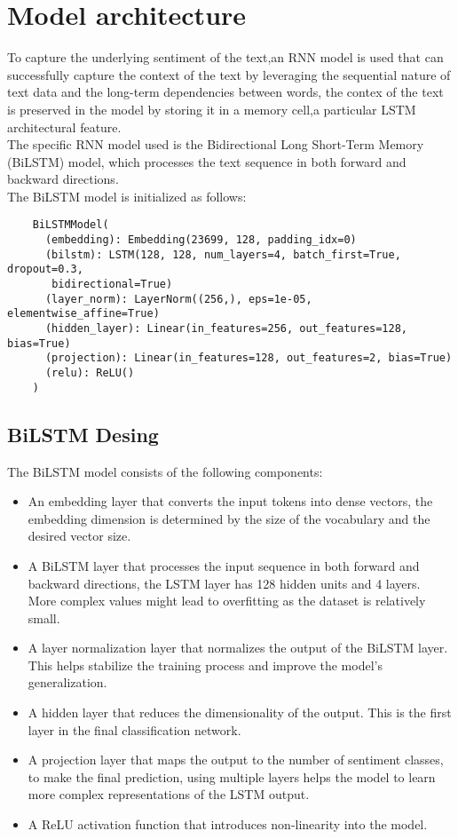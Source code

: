 \documentclass[11pt,a4paper]{article}
\begin{document}
\section{Model architecture}
To capture the underlying sentiment of the text,an RNN model is used that can successfully capture the context of the text by leveraging the sequential nature
of text data and the long-term dependencies between words,
 the contex of the text is preserved in the model by storing it in a memory cell,a particular LSTM architectural feature.
\\The specific RNN model used is the Bidirectional Long Short-Term Memory (BiLSTM) model, which processes the text sequence in both forward and backward directions.
\\The BiLSTM model is initialized as follows:


\begin{adjustbox}{width=0.5\columnwidth}
\begin{minipage}{\linewidth}
\begin{verbatim}
    BiLSTMModel(
      (embedding): Embedding(23699, 128, padding_idx=0)
      (bilstm): LSTM(128, 128, num_layers=4, batch_first=True, dropout=0.3,
       bidirectional=True)
      (layer_norm): LayerNorm((256,), eps=1e-05, elementwise_affine=True)
      (hidden_layer): Linear(in_features=256, out_features=128, bias=True)
      (projection): Linear(in_features=128, out_features=2, bias=True)
      (relu): ReLU()
    )
\end{verbatim}
\end{minipage}
\end{adjustbox}

\subsection{BiLSTM Desing}
The BiLSTM model consists of the following components:
\begin{itemize}
    \item An embedding layer that converts the input tokens into dense vectors, the embedding dimension is determined by the size of the vocabulary and the desired vector size.
    \item A BiLSTM layer that processes the input sequence in both forward and backward directions, the LSTM layer has 128 hidden units and 4 layers.\\ More complex values might lead to overfitting as the dataset is relatively small.
    \item A layer normalization layer that normalizes the output of the BiLSTM layer. This helps stabilize the training process and improve the model's generalization.
    \item A hidden layer that reduces the dimensionality of the output. This is the first layer in the final classification network.
    \item A projection layer that maps the output to the number of sentiment classes, to make the final prediction, using multiple layers helps the model to learn more complex representations of the LSTM output.
    \item A ReLU activation function that introduces non-linearity into the model.
\end{itemize}
\end{document}
